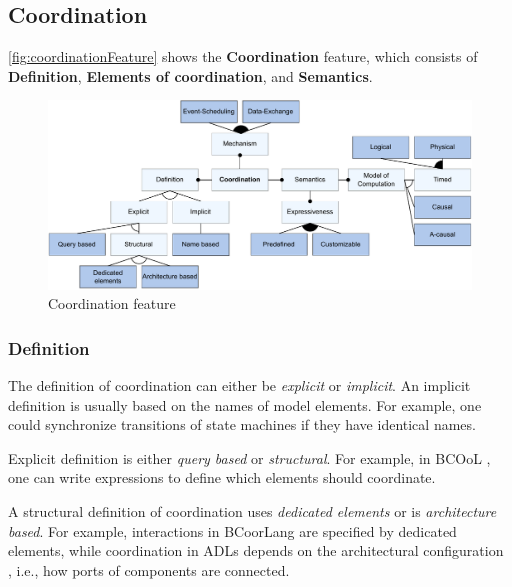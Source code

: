 \documentclass[runningheads]{llncs}
\begin{document}
\subsection{Coordination}

\autoref{fig:coordinationFeature} shows the \textbf {Coordination} feature, which consists of \textbf{Definition}, \textbf{Elements of coordination}, and \textbf{Semantics}.

\begin{figure}[ht]
	\centering
	\includegraphics[width=1\textwidth]{images/coordination_feature}
	\caption{Coordination feature}
	\label{fig:coordinationFeature}
\end{figure}

\subsubsection{Definition} The definition of coordination can either be \textit{explicit} or \textit{implicit}.
An implicit definition is usually based on the names of model elements.
For example, one could synchronize transitions of state machines if they have identical names.

Explicit definition is either \textit{query based} or \textit{structural}.
For example, in BCOoL \cite{varalarsenBCOolBehavioralCoordination2016,varalarsenBehavioralCoordinationOperator2015}, one can write expressions to define which elements should coordinate.

A structural definition of coordination uses \textit{dedicated elements} or is \textit{architecture based}.
For example, interactions in BCoorLang are specified by dedicated elements, while coordination in ADLs depends on the architectural configuration \cite{medvidovicClassificationComparisonFramework2000}, i.e., how ports of components are connected.
\end{document}
